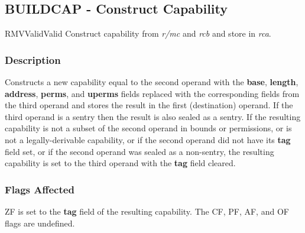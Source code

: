 \clearpage
{}
{}
\subsection*{BUILDCAP - Construct Capability}

\begin{x86opcodetable}
  {RMV}{Valid}{Valid}
  {Construct capability from \emph{r/mc} and \emph{rcb} and store in
    \emph{rca}.}
\end{x86opcodetable}

\begin{x86opentable}
\end{x86opentable}

\subsubsection*{Description}

Constructs a new capability equal to the second operand with the
\textbf{base}, \textbf{length}, \textbf{address}, \textbf{perms}, and
\textbf{uperms} fields replaced with the corresponding fields from the
third operand and stores the result in the first (destination) operand.
If the third operand is a sentry then the result is also sealed as a
sentry.  If the resulting capability is not a subset of the second
operand in bounds or permissions, or is not a legally-derivable
capability, or if the second operand did not have its \textbf{tag}
field set, or if the second operand was sealed as a non-sentry, the
resulting capability is set to the third operand with the \textbf{tag}
field cleared.

\subsubsection*{Flags Affected}

ZF is set to the \textbf{tag} field of the resulting capability.  The
CF, PF, AF, and OF flags are undefined.
